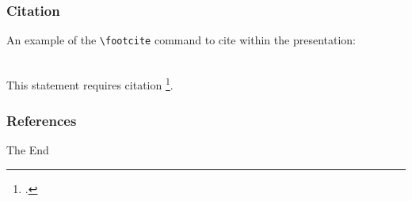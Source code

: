 \documentclass{beamer}
\begin{document}

\begin{frame}[fragile] %
\frametitle{Citation}
An example of the \verb|\footcite| command to cite within the presentation:\\~

This statement requires citation \footcite{p1}.
\end{frame}

\begin{frame}
    \frametitle{References}

    \hspace*{0.5cm} %
    \begin{minipage}{\dimexpr\textwidth-1cm\relax}
        \printbibliography
    \end{minipage}
\end{frame}




\begin{frame}
\Huge{\centerline{The End}}
\end{frame}

\end{document}
